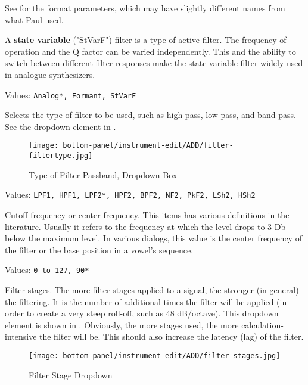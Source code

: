    See  for the format parameters,
   which may have slightly different names from what Paul used.

   A \textbf{state variable} ("StVarF") filter
   is a type of active filter.
   The frequency of operation and the Q factor can be varied independently.
   This and the ability to switch between different filter responses make the
   state-variable filter widely used in analogue synthesizers.

   Values: \texttt{Analog*, Formant, StVarF}

   Selects the type of filter to be used, such as high-pass, low-pass,
   and band-pass.
   See the dropdown element in .

\begin{figure}[H]
   \centering
   \texttt{[image: bottom-panel/instrument-edit/ADD/filter-filtertype.jpg]}
   \caption[Filter Type Dropdown]{Type of Filter Passband, Dropdown Box}
   \label{fig:filter_type_dropdown}
\end{figure}

   Values: \texttt{LPF1, HPF1, LPF2*, HPF2, BPF2, NF2, PkF2, LSh2, HSh2}

   Cutoff frequency or center frequency.
   This items has various definitions in the literature.
   Usually it refers to the frequency at which the level
   drops to 3 Db below the maximum level.
   In various dialogs, this value is the
   center frequency of the filter or the base position in
   a vowel's sequence.

   Values: \texttt{0 to 127, 90*}

   Filter stages.
   The more filter stages applied to a signal, the stronger (in general) the
   filtering.
   It is the number of additional times the filter will be applied (in
   order to create a very steep roll-off, such as 48 dB/octave).
   This dropdown element is shown in
   .
   Obviously, the more stages used, the more calculation-intensive the
   filter will be.  This should also increase the latency (lag) of the
   filter.

   \begin{figure}[H]
   \centering
   \texttt{[image: bottom-panel/instrument-edit/ADD/filter-stages.jpg]}
   \caption[Filter Stage Dropdown]{Filter Stage Dropdown}
   \label{fig:filter_stage_dropdown}
\end{figure}

